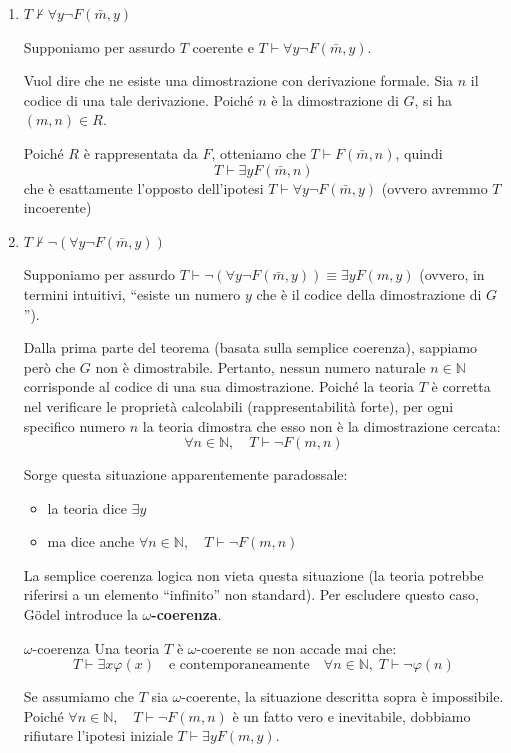 \documentclass[a4paper,11pt]{report}
\begin{document}
\begin{pframe}
    \begin{enumerate}
        \item \( T\not\vdash  \forall y \neg F(\bar{m}, y) \)
           
            Supponiamo per assurdo \( T \) coerente e \( T \vdash \forall y \neg F(\bar{m}, y)  \).

            Vuol dire che ne esiste una dimostrazione con derivazione formale. Sia \( n \) il codice di una tale derivazione. Poiché \( n \) è la dimostrazione di \( G \), si ha \( (m, n)\in R \). 

            Poiché \( R \) è rappresentata da \( F \), otteniamo che \( T\vdash F(\bar{m}, n) \), quindi 
            \[ T\vdash \exists y F(\bar{m}, n) \]
            che è esattamente l'opposto dell'ipotesi \( T \vdash \forall y \neg F(\bar{m}, y)   \) (ovvero avremmo \( T \) incoerente)


        \item \( T\not\vdash \neg ( \forall y \neg F(\bar{m}, y)) \)

            Supponiamo per assurdo \(T\vdash\neg (\forall y \neg F(\bar{m}, y))\equiv \exists y F(m, y)\)
            (ovvero, in termini intuitivi, ``esiste un numero \( y \) che è il codice della dimostrazione di \( G \)'').

            Dalla prima parte del teorema (basata sulla semplice coerenza), sappiamo però che \( G \) non è dimostrabile. Pertanto, nessun numero naturale \(  n \in \mathbb{N}\) corrisponde al codice di una sua dimostrazione.
Poiché la teoria \( T \) è corretta nel verificare le proprietà calcolabili (rappresentabilità forte), per ogni specifico numero \( n \) la teoria dimostra che esso non è la dimostrazione cercata:
\[
\forall n \in \mathbb{N}, \quad T \vdash \neg F(m, n)
\]

Sorge questa situazione apparentemente paradossale:
\begin{itemize}
    \item  la teoria dice \( \exists y \)
    \item  ma dice anche \( \forall n \in \mathbb{N}, \quad T \vdash \neg F(m, n)\)
\end{itemize}
La semplice coerenza logica non vieta questa situazione (la teoria potrebbe riferirsi a un elemento ``infinito'' non standard). Per escludere questo caso, Gödel introduce la \textbf{$\omega$-coerenza}.

\begin{defframe}{$\omega$-coerenza}{}
Una teoria $T$ è $\omega$-coerente se non accade mai che:
\[
T \vdash \exists x \varphi(x) \quad \text{e contemporaneamente} \quad \forall n \in \mathbb{N}, \; T \vdash \neg \varphi(n)
\]
\end{defframe}
Se assumiamo che \( T \) sia \(\omega\)-coerente, la situazione descritta sopra è impossibile.
Poiché \(\forall n \in \mathbb{N}, \quad T \vdash \neg F(m, n) \) è un fatto vero e inevitabile, dobbiamo rifiutare l'ipotesi iniziale \(T\vdash \exists y F(m, y) \).


\end{enumerate}
\end{pframe}
\end{document}
